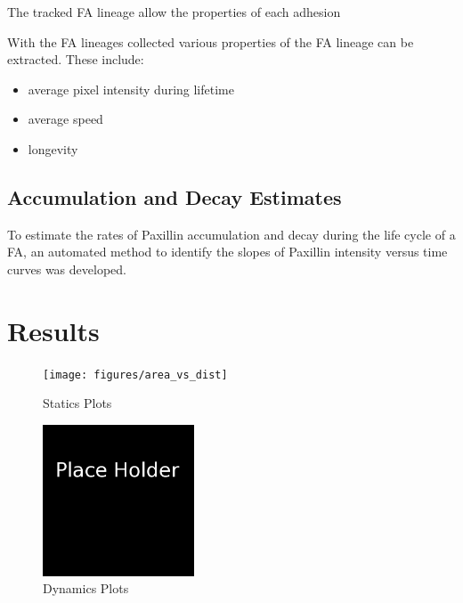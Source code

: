 \documentclass[letterpaper,twocolumn]{article}
\begin{document}
The tracked FA lineage allow the properties of each adhesion %

With the FA lineages collected various properties of the FA lineage can be extracted. These include:

\begin{itemize}
\item average pixel intensity during lifetime
\item average speed
\item longevity
\end{itemize}

\subsection*{Accumulation and Decay Estimates}

To estimate the rates of Paxillin accumulation and decay during the life cycle of a FA, an automated method to identify the slopes of Paxillin intensity versus time curves was developed. 

\section*{Results}

\begin{figure}[htbp]
\begin{center}
\texttt{[image: figures/area\_vs\_dist]}
\caption{Statics Plots}
\label{statics_figure}
\end{center}
\end{figure}

\begin{figure}[htbp]
\begin{center}
\includegraphics[width=0.4\textwidth]{figures/place_holder}
\caption{Dynamics Plots}
\label{dynamics_figure}
\end{center}
\end{figure}
\end{document}
